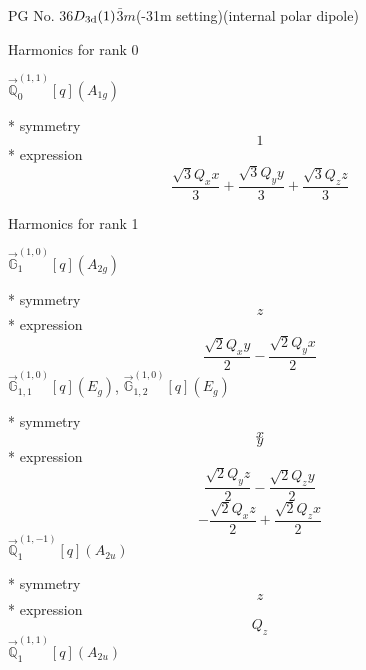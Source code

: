 \documentclass[fleqn,8pt]{jsarticle}
\begin{document}
\setcounter{MaxMatrixCols}{32}

\renewcommand{\tablename}{Table~}
\renewcommand{\figurename}{Figure~}
\begin{center}
\LARGE
PG No. 36\quad$D_{\rm 3d}(1)$\quad$\bar{3}m$\quad(-31m setting)\quad[ trigonal ] (internal polar dipole)
\end{center}

\noindent * Harmonics for rank 0

\noindent\quad $\vec{\mathbb{Q}}_{0}^{(1,1)}[q](A_{1g})$

\noindent\quad ** symmetry
\begin{dmath*}
1
\end{dmath*}
\noindent\quad ** expression
\begin{dmath*}
\frac{\sqrt{3} Q_{x} x}{3} + \frac{\sqrt{3} Q_{y} y}{3} + \frac{\sqrt{3} Q_{z} z}{3}
\end{dmath*}

\noindent * Harmonics for rank 1

\noindent\quad $\vec{\mathbb{G}}_{1}^{(1,0)}[q](A_{2g})$

\noindent\quad ** symmetry
\begin{dmath*}
z
\end{dmath*}
\noindent\quad ** expression
\begin{dmath*}
\frac{\sqrt{2} Q_{x} y}{2} - \frac{\sqrt{2} Q_{y} x}{2}
\end{dmath*}
\noindent\quad $\vec{\mathbb{G}}_{1,1}^{(1,0)}[q](E_{g})$, $\vec{\mathbb{G}}_{1,2}^{(1,0)}[q](E_{g})$

\noindent\quad ** symmetry
\begin{dmath*}
x
\end{dmath*}
\begin{dmath*}
y
\end{dmath*}
\noindent\quad ** expression
\begin{dmath*}
\frac{\sqrt{2} Q_{y} z}{2} - \frac{\sqrt{2} Q_{z} y}{2}
\end{dmath*}
\begin{dmath*}
- \frac{\sqrt{2} Q_{x} z}{2} + \frac{\sqrt{2} Q_{z} x}{2}
\end{dmath*}
\noindent\quad $\vec{\mathbb{Q}}_{1}^{(1,-1)}[q](A_{2u})$

\noindent\quad ** symmetry
\begin{dmath*}
z
\end{dmath*}
\noindent\quad ** expression
\begin{dmath*}
Q_{z}
\end{dmath*}
\noindent\quad $\vec{\mathbb{Q}}_{1}^{(1,1)}[q](A_{2u})$
\end{document}
